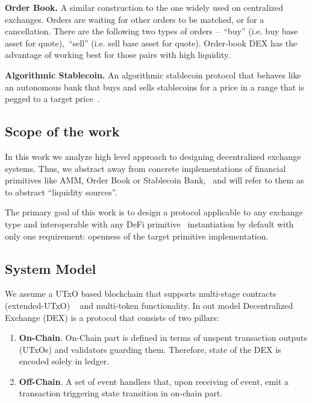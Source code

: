\documentclass[11pt]{article}
\begin{document}
\begin{sloppypar}
        \textbf{Order Book.} A similar construction to the one widely used on centralized exchanges.
        Orders are waiting for other orders to be matched, or for a cancellation.
        There are the following two types of orders --~\enquote{buy} (i.e. buy base asset for quote),~\enquote{sell} (i.e. sell base asset for quote).
        Order-book DEX has the advantage of working best for those pairs with high liquidity.

        \textbf{Algorithmic Stablecoin.} An algorithmic stablecoin protocol that behaves like an autonomous bank that buys and sells stablecoins for a price in a range that is pegged to a target price~\cite{cryptoeprint:2021/1069}.

        \subsection{Scope of the work}\label{subsec:scope-of-the-work}
        In this work we analyze high level approach to designing decentralized exchange systems.
        Thus, we abstract away from concrete implementations of financial primitives like AMM, Order Book or Stablecoin Bank, \
        and will refer to them as to abstract \enquote{liquidity sources}.

        The primary goal of this work is to design a protocol applicable to any exchange type and interoperable with any DeFi primitive \
        instantiation by default with only one requirement: openness of the target primitive implementation.

        \subsection{System Model}\label{subsec:system-model}
        We assume a UTxO based blockchain that supports multi-stage contracts (extended-UTxO) ~\cite{chepurnoy2018selfreproducing} and multi-token functionality.
        In out model Decentralized Exchange (DEX) is a protocol that consists of two pillars:
        \begin{enumerate}
            \item \textbf{On-Chain}.
            On-Chain part is defined in terms of unspent transaction outputs (UTxOs) and validators guarding them.
            Therefore, state of the DEX is encoded solely in ledger.
            \item \textbf{Off-Chain}.
            A set of event handlers that, upon receiving of event, emit a transaction triggering state transition in on-chain part.
        \end{enumerate}


\end{sloppypar}
\end{document}

